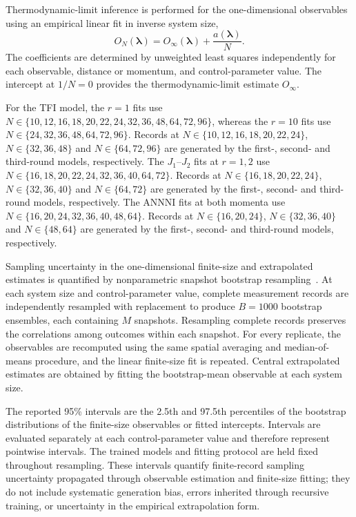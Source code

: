 \documentclass[pdflatex,sn-nature]{sn-jnl}%
\theoremstyle{thmstyleone}%
\theoremstyle{thmstyletwo}%
\theoremstyle{thmstylethree}%
\begin{document}
Thermodynamic-limit inference is performed for the one-dimensional observables using an empirical linear fit in inverse system size,
\begin{equation}
\label{eq:finite_size_extrapolation}
O_N(\boldsymbol{\lambda})
=
O_{\infty}(\boldsymbol{\lambda})
+
\frac{a(\boldsymbol{\lambda})}{N}.
\end{equation}
The coefficients are determined by unweighted least squares independently for each observable, distance or momentum, and control-parameter value. The intercept at \(1/N=0\) provides the thermodynamic-limit estimate \(O_{\infty}\).

For the TFI model, the \(r=1\) fits use
\(N\in\{10,12,16,18,20,22,24,32,36,48,64,72,96\}\),
whereas the \(r=10\) fits use
\(N\in\{24,32,36,48,64,72,96\}\).
Records at \(N\in\{10,12,16,18,20,22,24\}\),
\(N\in\{32,36,48\}\) and \(N\in\{64,72,96\}\)
are generated by the first-, second- and third-round models, respectively.
The \(J_1\)--\(J_2\) fits at \(r=1,2\) use
\(N\in\{16,18,20,22,24,32,36,40,64,72\}\). Records at \(N\in\{16,18,20,22,24\}\),
\(N\in\{32,36,40\}\) and \(N\in\{64,72\}\)
are generated by the first-, second- and third-round models, respectively.
The ANNNI fits at both momenta use
\(N\in\{16,20,24,32,36,40,48,64\}\). Records at \(N\in\{16,20,24\}\),
\(N\in\{32,36,40\}\) and \(N\in\{48, 64\}\)
are generated by the first-, second- and third-round models, respectively.

Sampling uncertainty in the one-dimensional finite-size and extrapolated estimates is quantified by nonparametric snapshot bootstrap resampling~\cite{efron1992bootstrap}.
At each system size and control-parameter value, complete measurement records are independently resampled with replacement to produce \(B=1000\) bootstrap ensembles, each containing \(M\) snapshots. Resampling complete records preserves the correlations among outcomes within each snapshot. For every replicate, the observables are recomputed using the same spatial averaging and median-of-means procedure, and the linear finite-size fit is repeated. Central extrapolated estimates are obtained by fitting the bootstrap-mean observable at each system size.

The reported 95\% intervals are the 2.5th and 97.5th percentiles of the bootstrap distributions of the finite-size observables or fitted intercepts. Intervals are evaluated separately at each control-parameter value and therefore represent pointwise intervals. The trained models and fitting protocol are held fixed throughout resampling. These intervals quantify finite-record sampling uncertainty propagated through observable estimation and finite-size fitting; they do not include systematic generation bias, errors inherited through recursive training, or uncertainty in the empirical extrapolation form.
\end{document}
